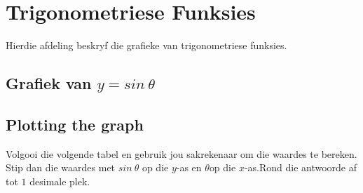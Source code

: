 \section{Trigonometriese Funksies}
\nopagebreak
Hierdie afdeling beskryf die grafieke van trigonometriese funksies.\par 

\subsection{Grafiek van $y=sin~\theta $}
\subsection*{Plotting the graph}
\nopagebreak
Volgooi die volgende tabel en gebruik jou sakrekenaar om die waardes te bereken. Stip dan die waardes met $sin~\theta $ op die $y$-as en $\theta $op die $x$-as.Rond die antwoorde af tot $1$ desimale plek.\par 

